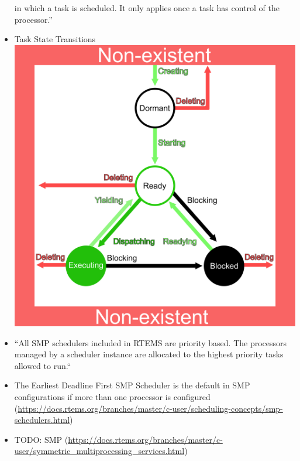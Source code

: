 \begin{itemize}
        in which a task is scheduled. 
        It only applies once a task has control of the processor.''
        \cite[\S5.2.3.2]{RTEMS:CUSER}
    \item
      Task State Transitions \cite[\S5.2.5]{RTEMS:CUSER}
      \\
      \includegraphics[scale=0.3]{images/states.png}
    \item
      ``All SMP schedulers included in RTEMS are priority based. 
       The processors managed by a scheduler instance are allocated 
       to the highest priority tasks allowed to run.``
      \cite[\S5.4]{RTEMS:CUSER}
    \item 
      The Earliest Deadline First SMP Scheduler is the default in SMP configurations
      if more than one processor is configured
      \cite[\S5.4.1]{RTEMS:CUSER}
      (\url{https://docs.rtems.org/branches/master/c-user/scheduling-concepts/smp-schedulers.html})
    \item TODO: SMP
      (\url{https://docs.rtems.org/branches/master/c-user/symmetric_multiprocessing_services.html})
\end{itemize}



